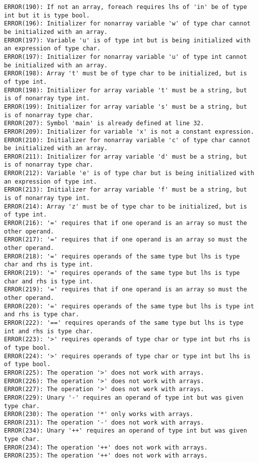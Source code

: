 \documentclass[12pt]{book}
\begin{document}
\begin{lstlisting}
ERROR(190): If not an array, foreach requires lhs of 'in' be of type int but it is type bool.
ERROR(196): Initializer for nonarray variable 'w' of type char cannot be initialized with an array.
ERROR(197): Variable 'u' is of type int but is being initialized with an expression of type char.
ERROR(197): Initializer for nonarray variable 'u' of type int cannot be initialized with an array.
ERROR(198): Array 't' must be of type char to be initialized, but is of type int.
ERROR(198): Initializer for array variable 't' must be a string, but is of nonarray type int.
ERROR(199): Initializer for array variable 's' must be a string, but is of nonarray type char.
ERROR(207): Symbol 'main' is already defined at line 32.
ERROR(209): Initializer for variable 'x' is not a constant expression.
ERROR(210): Initializer for nonarray variable 'c' of type char cannot be initialized with an array.
ERROR(211): Initializer for array variable 'd' must be a string, but is of nonarray type char.
ERROR(212): Variable 'e' is of type char but is being initialized with an expression of type int.
ERROR(213): Initializer for array variable 'f' must be a string, but is of nonarray type int.
ERROR(214): Array 'z' must be of type char to be initialized, but is of type int.
ERROR(216): '=' requires that if one operand is an array so must the other operand.
ERROR(217): '=' requires that if one operand is an array so must the other operand.
ERROR(218): '=' requires operands of the same type but lhs is type char and rhs is type int.
ERROR(219): '=' requires operands of the same type but lhs is type char and rhs is type int.
ERROR(219): '=' requires that if one operand is an array so must the other operand.
ERROR(220): '=' requires operands of the same type but lhs is type int and rhs is type char.
ERROR(222): '==' requires operands of the same type but lhs is type int and rhs is type char.
ERROR(223): '>' requires operands of type char or type int but rhs is of type bool.
ERROR(224): '>' requires operands of type char or type int but lhs is of type bool.
ERROR(225): The operation '>' does not work with arrays.
ERROR(226): The operation '>' does not work with arrays.
ERROR(227): The operation '>' does not work with arrays.
ERROR(229): Unary '-' requires an operand of type int but was given type char.
ERROR(230): The operation '*' only works with arrays.
ERROR(231): The operation '-' does not work with arrays.
ERROR(234): Unary '++' requires an operand of type int but was given type char.
ERROR(234): The operation '++' does not work with arrays.
ERROR(235): The operation '++' does not work with arrays.

\end{lstlisting}
\end{document}
